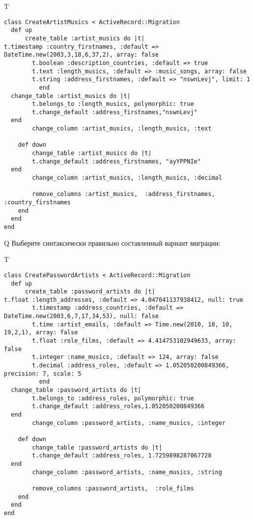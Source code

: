 T
\begin{verbatim}
class CreateArtistMusics < ActiveRecord::Migration
  def up
	  create_table :artist_musics do |t|
t.timestamp :country_firstnames, :default => DateTime.new(2003,3,18,6,37,2), array: false
		t.boolean :description_countries, :default => true
		t.text :length_musics, :default => :music_songs, array: false
		t.string :address_firstnames, :default => "nswnLevj", limit: 1
		  end
  change_table :artist_musics do |t|
		t.belongs_to :length_musics, polymorphic: true
 		t.change_default :address_firstnames,"nswnLevj"
  end
 		change_column :artist_musics, :length_musics, :text
   
	def down
		change_table :artist_musics do |t|
		t.change_default :address_firstnames, "ayYPPNIe"
  end
 		change_column :artist_musics, :length_musics, :decimal
   
		remove_columns :artist_musics,  :address_firstnames, :country_firstnames 
    end 
  end
end

\end{verbatim}

Q
Выберите синтаксически правильно составленный вариант миграции:

T
\begin{verbatim}
class CreatePasswordArtists < ActiveRecord::Migration
  def up
	  create_table :password_artists do |t|
t.float :length_addresses, :default => 4.047041137938412, null: true
		t.timestamp :address_countries, :default => DateTime.new(2003,6,7,17,34,53), null: false
		t.time :artist_emails, :default => Time.new(2010, 10, 10, 19,2,1), array: false
		t.float :role_films, :default => 4.414753102949633, array: false
		t.integer :name_musics, :default => 124, array: false
		t.decimal :address_roles, :default => 1.052050200849366, precision: 7, scale: 5
		  end
  change_table :password_artists do |t|
		t.belongs_to :address_roles, polymorphic: true
 		t.change_default :address_roles,1.052050200849366
  end
 		change_column :password_artists, :name_musics, :integer
   
	def down
		change_table :password_artists do |t|
		t.change_default :address_roles, 1.7259898287067728
  end
 		change_column :password_artists, :name_musics, :string
   
		remove_columns :password_artists,  :role_films 
    end 
  end
end

\end{verbatim}

